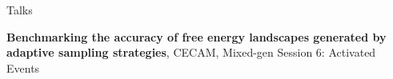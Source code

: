 \begin{rubric}{Talks}


\entry*[\hspace{1.05cm}2021] \textbf{Benchmarking the accuracy of free energy landscapes generated by adaptive sampling strategies}, CECAM, Mixed-gen Session 6: Activated Events
\end{rubric}
